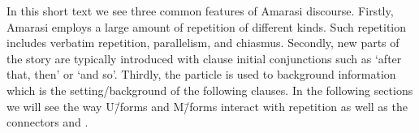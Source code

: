 In this short text we see three common features of Amarasi discourse.
Firstly, Amarasi employs a large amount of repetition of different kinds.
Such repetition includes verbatim repetition, parallelism, and chiasmus.
Secondly, new parts of the story are typically introduced with clause initial
conjunctions such as  `after that, then' or  `and so'.
Thirdly, the particle  is used to background information
which is the setting/background of the following clauses.
In the following sections we will see the way U\=/forms and M\=/forms
interact with repetition as well as the connectors  and .
